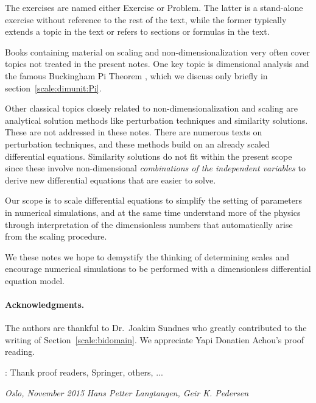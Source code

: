 \documentclass[graybox,envcountchap,sectrefs,final]{svmonodo}
\newcommand{\shortinlinecomment}[3]{{\color{red}{\bf #1}: #2}}
\newenvironment{warning_mdfboxadmon}[1][]{
\begin{warning_mdfboxmdframed}[frametitle=#1]
}
{
\end{warning_mdfboxmdframed}
}
\begin{document}
The exercises are named either Exercise or Problem. The latter is
a stand-alone exercise without reference to the rest of the text, while
the former typically extends a topic in the text or refers to sections or
formulas in the text.


\begin{warning_mdfboxadmon}
Books containing material on
scaling and non-dimensionalization very often cover
topics not treated in the present notes. One key topic is
dimensional analysis and the famous Buckingham Pi Theorem
\cite{Douglas_et_al_1979,Logan_1987}, which we discuss only briefly in
section~\ref{scale:dimunit:Pi}.

Other classical topics closely related to non-dimensionalization and
scaling are analytical solution methods like perturbation techniques
and similarity solutions. These are not addressed in these notes.
There are numerous texts on perturbation techniques, and these methods
build on an already scaled differential equations. Similarity
solutions do not fit within the present scope since these involve
non-dimensional \emph{combinations of the independent variables} to derive
new differential equations that are easier to solve.

Our scope is to scale differential
equations to simplify the setting of parameters in numerical simulations,
and at the same time understand more of the physics
through interpretation of the dimensionless numbers that automatically
arise from the scaling procedure.
\end{warning_mdfboxadmon}



We these notes we hope to demystify the thinking of determining scales
and encourage numerical simulations to be performed with a dimensionless
differential equation model.

\paragraph{Acknowledgments.}
The authors are thankful to Dr.~Joakim Sundnes who greatly contributed to
the writing of Section~\ref{scale:bidomain}. We appreciate
Yapi Donatien Achou's proof reading.

\shortinlinecomment{hpl 1}{ Thank proof readers, Springer, others, ... }{ Thank proof readers, Springer, }


\vspace{1cm}

\noindent
{\it Oslo, November 2015}  \hfill  {\it Hans Petter Langtangen, Geir K. Pedersen}
\end{document}
